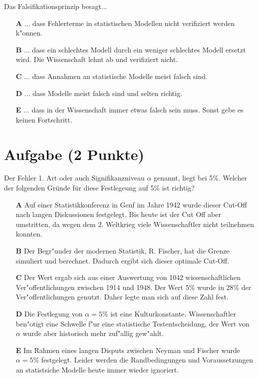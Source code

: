 \documentclass[a4paper, 9pt]{scrartcl}\usepackage[]{graphicx}\usepackage[]{xcolor}
\begin{document}
Das Falsifikationsprinzip besagt... 



\begin{enumerate}
\item [\textbf{A} \msquare] ... dass Fehlerterme in statistischen Modellen nicht verifiziert werden k{"o}nnen.
\item [\textbf{B} \msquare] ... dass ein schlechtes Modell durch ein weniger schlechtes Modell ersetzt wird. Die Wissenschaft lehnt ab und verifiziert nicht.
\item [\textbf{C} \msquare] ... dass Annahmen an statistische Modelle meist falsch sind.
\item [\textbf{D} \msquare] ... dass Modelle meist falsch sind und selten richtig.
\item [\textbf{E} \msquare] ... dass in der Wissenschaft immer etwas falsch sein muss. Sonst gebe es keinen Fortschritt.
\end{enumerate}

\section{Aufgabe \hfill (2 Punkte)}

Der Fehler 1. Art oder auch Signifikanzniveau $\alpha$ genannt, liegt bei
5\%. Welcher der folgenden Gr{\"u}nde f{\"u}r diese Festlegeung auf 5\% ist richtig?



\begin{enumerate}
\item [\textbf{A} \msquare] Auf einer Statistikkonferenz in Genf im Jahre 1942 wurde dieser Cut-Off nach langen Diskussionen festgelegt. Bis heute ist der Cut Off aber umstritten, da wegen dem 2. Weltkrieg viele Wissenschaftler nicht teilnehmen konnten.
\item [\textbf{B} \msquare] Der Begr{"u}nder der modernen Statistik, R. Fischer, hat die Grenze simuliert und berechnet. Dadurch ergibt sich dieser optimale Cut-Off.
\item [\textbf{C} \msquare] Der Wert ergab sich aus einer Auswertung von 1042 wissenschaftlichen Ver{"o}ffentlichungen zwischen 1914 und 1948. Der Wert $5\%$ wurde in $28\%$ der Ver{"o}ffentlichungen genutzt. Daher legte man sich auf diese Zahl fest.
\item [\textbf{D} \msquare] Die Festlegung von $\alpha = 5\%$ ist eine Kulturkonstante. Wissenschaftler ben{"o}tigt eine Schwelle f{"u}r eine statistische Testentscheidung, der Wert von $\alpha$ wurde aber historisch mehr zuf{"a}llig gew{"a}hlt.
\item [\textbf{E} \msquare] Im Rahmen eines langen Disputs zwischen Neyman und Fischer wurde $\alpha = 5\%$ festgelegt. Leider werden die Randbedingungen und Voraussetzungen an statistsiche Modelle heute immer wieder ignoriert.
\end{enumerate}
\end{document}
